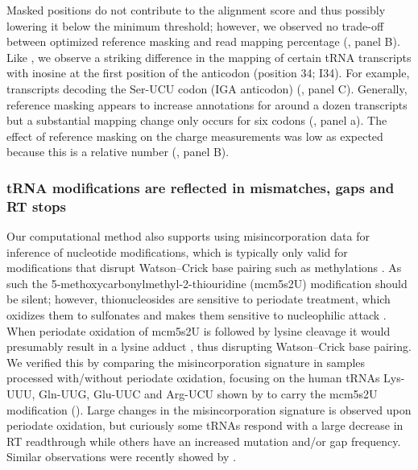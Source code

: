 \documentclass[9pt,lineno]{elife}
\begin{document}
Masked positions do not contribute to the alignment score and thus possibly lowering it below the minimum threshold; however, we observed no trade-off between optimized reference masking and read mapping percentage (, panel B).
Like \cite{Behrens2021-gb}, we observe a striking difference in the mapping of certain tRNA transcripts with inosine at the first position of the anticodon (position 34; I34).
For example, transcripts decoding the Ser-UCU codon (IGA anticodon) (, panel C).
Generally, reference masking appears to increase annotations for around a dozen transcripts but a substantial mapping change only occurs for six codons (, panel a).
The effect of reference masking on the charge measurements was low as expected because this is a relative number (, panel B).





\subsubsection{tRNA modifications are reflected in mismatches, gaps and RT stops}
Our computational method also supports using misincorporation data for inference of nucleotide modifications, which is typically only valid for modifications that disrupt Watson–Crick base pairing such as methylations \citep{Clark2016-ph, Behrens2021-gb}.
As such the 5-methoxycarbonylmethyl-2-thiouridine (mcm5s2U) modification should be silent; however, thionucleosides are sensitive to periodate treatment, which oxidizes them to sulfonates and makes them sensitive to nucleophilic attack \citep{Ziff1968-la, Rao1974-zq}.
When periodate oxidation of mcm5s2U is followed by lysine cleavage it would presumably result in a lysine adduct \citep{Ziff1968-la}, thus disrupting Watson–Crick base pairing.
We verified this by comparing the misincorporation signature in samples processed with/without periodate oxidation, focusing on the human tRNAs Lys-UUU, Gln-UUG, Glu-UUC and Arg-UCU shown by \cite{Lentini2018-xs} to carry the mcm5s2U modification ().
Large changes in the misincorporation signature is observed upon periodate oxidation, but curiously some tRNAs respond with a large decrease in RT readthrough while others have an increased mutation and/or gap frequency.
Similar observations were recently showed by \cite{Katanski2022-ij}.
\end{document}
